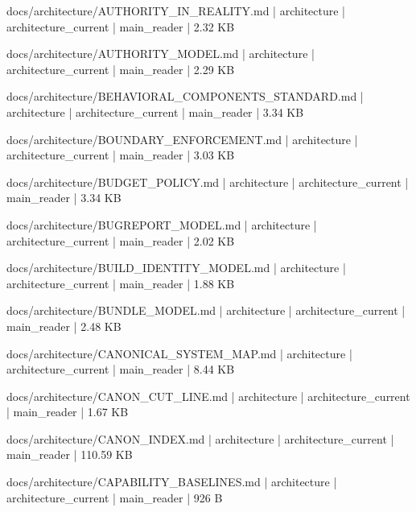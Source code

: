 \documentclass[11pt,a4paper]{report}
\begin{document}
{\small\ttfamily\raggedright docs/\allowbreak{}architecture/\allowbreak{}AUTHORITY\_IN\_REALITY.\allowbreak{}md | architecture | architecture\_current | main\_reader | 2.\allowbreak{}32 KB\par}
{\small\ttfamily\raggedright docs/\allowbreak{}architecture/\allowbreak{}AUTHORITY\_MODEL.\allowbreak{}md | architecture | architecture\_current | main\_reader | 2.\allowbreak{}29 KB\par}
{\small\ttfamily\raggedright docs/\allowbreak{}architecture/\allowbreak{}BEHAVIORAL\_COMPONENTS\_STANDARD.\allowbreak{}md | architecture | architecture\_current | main\_reader | 3.\allowbreak{}34 KB\par}
{\small\ttfamily\raggedright docs/\allowbreak{}architecture/\allowbreak{}BOUNDARY\_ENFORCEMENT.\allowbreak{}md | architecture | architecture\_current | main\_reader | 3.\allowbreak{}03 KB\par}
{\small\ttfamily\raggedright docs/\allowbreak{}architecture/\allowbreak{}BUDGET\_POLICY.\allowbreak{}md | architecture | architecture\_current | main\_reader | 3.\allowbreak{}34 KB\par}
{\small\ttfamily\raggedright docs/\allowbreak{}architecture/\allowbreak{}BUGREPORT\_MODEL.\allowbreak{}md | architecture | architecture\_current | main\_reader | 2.\allowbreak{}02 KB\par}
{\small\ttfamily\raggedright docs/\allowbreak{}architecture/\allowbreak{}BUILD\_IDENTITY\_MODEL.\allowbreak{}md | architecture | architecture\_current | main\_reader | 1.\allowbreak{}88 KB\par}
{\small\ttfamily\raggedright docs/\allowbreak{}architecture/\allowbreak{}BUNDLE\_MODEL.\allowbreak{}md | architecture | architecture\_current | main\_reader | 2.\allowbreak{}48 KB\par}
{\small\ttfamily\raggedright docs/\allowbreak{}architecture/\allowbreak{}CANONICAL\_SYSTEM\_MAP.\allowbreak{}md | architecture | architecture\_current | main\_reader | 8.\allowbreak{}44 KB\par}
{\small\ttfamily\raggedright docs/\allowbreak{}architecture/\allowbreak{}CANON\_CUT\_LINE.\allowbreak{}md | architecture | architecture\_current | main\_reader | 1.\allowbreak{}67 KB\par}
{\small\ttfamily\raggedright docs/\allowbreak{}architecture/\allowbreak{}CANON\_INDEX.\allowbreak{}md | architecture | architecture\_current | main\_reader | 110.\allowbreak{}59 KB\par}
{\small\ttfamily\raggedright docs/\allowbreak{}architecture/\allowbreak{}CAPABILITY\_BASELINES.\allowbreak{}md | architecture | architecture\_current | main\_reader | 926 B\par}
\end{document}
